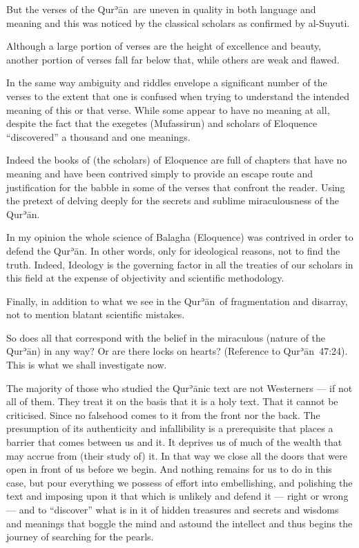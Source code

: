 \documentclass[12pt]{memoir}
\def\´{ʾ} %
\def \Quran{Qur\-\´ān} %
\newcommand{\QRef}[1]{{\color{darkblue}#1}}
\begin{document}
But the verses of the \Quran\ are uneven in quality
in both language and meaning and this was noticed
by the classical scholars as confirmed by al-Suyuti.

Although a large portion of verses are the height of excellence and beauty,
another portion of verses fall far below that,
while others are weak and flawed.

In the same way ambiguity and riddles envelope a significant number of
the verses to the extent that one is confused when trying to understand
the intended meaning of this or that verse.
While some appear to have no meaning at all,
despite the fact that the exegetes (Mufassirun) and
scholars of Eloquence “discovered” a thousand and one meanings.

Indeed the books of (the scholars) of Eloquence are full of chapters
that have no meaning and have been contrived simply to provide an escape
route and justification for the babble in some of the verses
that confront the reader.
Using the pretext of delving deeply for the secrets
and sublime miraculousness of the \Quran.

In my opinion the whole science of Balagha (Eloquence)
was contrived in order to defend the \Quran.
In other words, only for ideological reasons, not to find the truth.
Indeed, Ideology is the governing factor in all the treaties of our scholars
in this field at the expense of objectivity and scientific methodology.

Finally, in addition to what we see in the \Quran\ of fragmentation
and disarray, not to mention blatant scientific mistakes.

So does all that correspond with the belief in the miraculous
(nature of the \Quran) in any way?
Or are there locks on hearts?
(Reference to \Quran\ \QRef{47:24}).
This is what we shall investigate now.

The majority of those who studied the \Quran{}ic text are not Westerners —
if not all of them.
They treat it on the basis that it is a holy text.
That it cannot be criticised.
Since no falsehood comes to it from the front nor the back.
The presumption of its authenticity and infallibility is a prerequisite
that places a barrier that comes between us and it.
It deprives us of much of the wealth that may accrue from (their study of) it.
In that way we close all the doors that were open
in front of us before we begin.
And nothing remains for us to do in this case,
but pour everything we possess of effort into embellishing,
and polishing the text and imposing upon it
that which is unlikely and defend it — right or wrong —
and to “discover” what is in it of hidden treasures and secrets and
wisdoms and meanings that boggle the mind and astound the intellect and
thus begins the journey of searching for the pearls.
\end{document}
